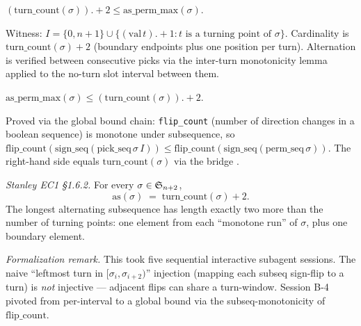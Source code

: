 \begin{theorem}
  \label{thm:as_perm_max_lower}
  \rocqok
  $(\mathrm{turn\_count}(\sigma)).+2 \leq \mathrm{as\_perm\_max}(\sigma)$.

  Witness: $I = \{0, n+1\} \cup \{(\mathrm{val}\,t).+1 : t \text{ is a turning point of }\sigma\}$.
  Cardinality is $\mathrm{turn\_count}(\sigma) + 2$ (boundary endpoints
  plus one position per turn).  Alternation is verified between
  consecutive picks via the inter-turn monotonicity lemma applied to
  the no-turn slot interval between them.
\end{theorem}

\begin{theorem}
  \label{thm:as_perm_max_upper}
  \rocqok
  $\mathrm{as\_perm\_max}(\sigma) \leq (\mathrm{turn\_count}(\sigma)).+2$.

  Proved via the global bound chain: \texttt{flip\_count} (number of
  direction changes in a boolean sequence) is monotone under
  subsequence, so $\mathrm{flip\_count}(\mathrm{sign\_seq}(\mathrm{pick\_seq}\,\sigma\,I))
  \leq \mathrm{flip\_count}(\mathrm{sign\_seq}(\mathrm{perm\_seq}\,\sigma))$.
  The right-hand side equals $\mathrm{turn\_count}(\sigma)$ via the
  bridge .
\end{theorem}

\begin{corollary}
  \label{cor:as_perm_max_eq}
  \rocqok
  \emph{Stanley EC1 \S1.6.2.}  For every $\sigma \in \mathfrak{S}_{n+2}$,
  \[
    \mathrm{as}(\sigma) \;=\; \mathrm{turn\_count}(\sigma) + 2.
  \]
  The longest alternating subsequence has length exactly two more
  than the number of turning points: one element from each ``monotone
  run'' of $\sigma$, plus one boundary element.

  \emph{Formalization remark.}  This took five sequential interactive
  subagent sessions.  The naive ``leftmost turn in
  $[\sigma_i, \sigma_{i+2})$'' injection (mapping each subseq sign-flip
  to a turn) is \emph{not} injective — adjacent flips can share a
  turn-window.  Session B-4 pivoted from per-interval to a global
  bound via the subseq-monotonicity of $\mathrm{flip\_count}$.
\end{corollary}

